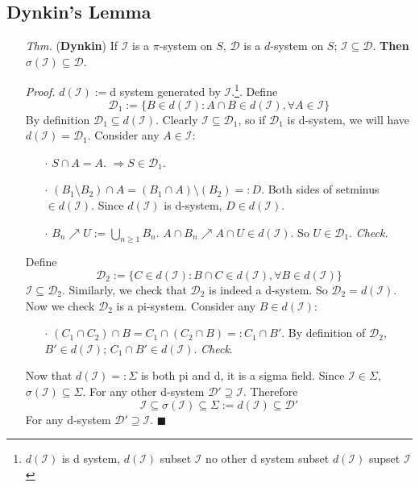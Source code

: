 \documentclass[a4paper,12pt,twoside]{book}
\begin{document}
\subsection{Dynkin's Lemma}
\begin{itemize}
	\item[\textit{Thm.}] (\textbf{Dynkin}) If $\mathcal{I}$ is a $\pi$-system on $S$, $\mathcal{D}$ is a $d$-system on $S$; $\mathcal{I} \subseteq \mathcal{D}$. \textbf{Then} $\sigma(\mathcal{I}) \subseteq \mathcal{D}$.
	
	\item[\textit{Proof.}] $d(\mathcal{I}):=$d system generated by $\mathcal{I}$.\footnote{$d(\mathcal{I})$ is d system, $d(\mathcal{I})$ subset $\mathcal{I}$ no other d system subset $d(\mathcal{I})$ supset $\mathcal{I}$}. Define
	\begin{equation}
		\mathcal{D}_1:=\{B\in d(\mathcal{I}): A\cap B\in d(\mathcal{I}), \forall A\in \mathcal{I}\}
	\end{equation}
	By definition $\mathcal{D}_1 \subseteq d(\mathcal{I})$. Clearly $\mathcal{I}\subseteq \mathcal{D}_1$, so if $\mathcal{D}_1$ is d-system, we will have $d(\mathcal{I})=\mathcal{D}_1$. Consider any $A\in \mathcal{I}$:
	\begin{itemize}
		\item[$\cdot$] $S\cap A=A$. $\Rightarrow S \in \mathcal{D}_1$.
		\item[$\cdot$] $(B_1\setminus B_2)\cap A=(B_1 \cap A)\setminus(B_2)=:D$. Both sides of setminus $\in d(\mathcal{I})$. Since $d(\mathcal{I})$ is d-system, $D\in d(\mathcal{I})$.
		\item[$\cdot$] $B_n\nearrow U:=\bigcup_{n\geq 1}B_n$. $A\cap B_n \nearrow A\cap U\in d(\mathcal{I})$. So $U\in \mathcal{D}_1$. \textit{Check.}
	\end{itemize}
	Define
	\begin{equation}
		\mathcal{D}_2 := \{C\in d(\mathcal{I}): B\cap C\in d(\mathcal{I}), \forall B\in d(\mathcal{I})\}
	\end{equation}
	$\mathcal{I}\subseteq \mathcal{D}_2$. Similarly, we check that $\mathcal{D}_2$ is indeed a d-system. So $\mathcal{D}_2 = d(\mathcal{I})$. Now we check $\mathcal{D}_2$ is a pi-system. Consider any $B\in d(\mathcal{I})$:
	\begin{itemize}
		\item[$\cdot$] $(C_1 \cap C_2) \cap B=C_1 \cap (C_2\cap B)=:C_1 \cap B'$. By definition of $\mathcal{D}_2$, $B'\in d(\mathcal{I})$; $C_1 \cap B'\in d(\mathcal{I})$. \textit{Check}.
	\end{itemize}
	Now that $d(\mathcal{I})=:\Sigma$ is both pi and d, it is a sigma field. \newline
	Since $\mathcal{I}\in \Sigma$, $\sigma(\mathcal{I})\subseteq \Sigma$.\newline
	For any other d-system $\mathcal{D}'\supseteq \mathcal{I}$. Therefore 
	\begin{equation}
		\mathcal{I}\subseteq\sigma(\mathcal{I})\subseteq\Sigma:=d(\mathcal{I})\subseteq \mathcal{D}'
	\end{equation}
	For any d-system $\mathcal{D}'\supseteq \mathcal{I}$. $\blacksquare$


\end{itemize}
\end{document}
